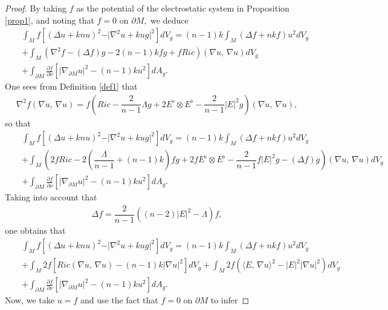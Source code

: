 \documentclass{amsart}
\numberwithin{equation}{section}
\begin{document}
\begin{proof}
By taking $f$ as the potential of the electrostatic system in Proposition \ref{prop1}, and noting that $f = 0$ on $\partial M,$ we deduce
		\begin{eqnarray*}
			&&\int_{M}f\left[\left(\Delta u +knu\right)^2 - \vert \nabla^2u+kug\vert^{2}\right]dV_g = (n-1)k\int_{M}\left(\Delta f +nkf\right)u^2dV_g\\
			&&+\int_{M}\left(\nabla^2f-(\Delta f)g - 2(n-1)kfg +fRic\right)(\nabla u,\,\nabla u)dV_g\\
			&&+\int_{\partial M}\frac{\partial f}{\partial\nu}\left[\vert\nabla_{\partial M}u\vert^2 -(n-1)ku^2\right]dA_g.
		\end{eqnarray*} One sees from Definition \ref{def1} that
		\begin{eqnarray*}
			\nabla^2f(\nabla u,\,\nabla u) = f\left(Ric - \dfrac{2}{n-1}\Lambda g + 2E^\flat\otimes E^\flat - \dfrac{2}{n-1}|E|^2g\right)(\nabla u,\,\nabla u),
		\end{eqnarray*}
		so that
		\begin{eqnarray*}
			&&\int_{M}f\left[\left(\Delta u +knu\right)^2 - \vert \nabla^2u+kug\vert^{2}\right]dV_g = (n-1)k\int_{M}\left(\Delta f +nkf\right)u^2dV_g\\
			&&+\int_{M}\left(2f{Ric} - 2\left(\dfrac{\Lambda}{n-1} +(n-1)k\right)fg + 2f E^\flat\otimes E^\flat - \dfrac{2}{n-1}f|E|^2g-(\Delta f)g	\right)(\nabla u,\,\nabla u)dV_g\\
			&&+\int_{\partial M}\frac{\partial f}{\partial\nu}\left[\vert\nabla_{\partial M}u\vert^2 -(n-1)ku^2\right]dA_g.
		\end{eqnarray*} Taking into account that
		\begin{eqnarray*}
			\Delta f = \dfrac{2}{n - 1}\left((n - 2)|E|^2 - 
			\Lambda\right)f,
		\end{eqnarray*}
		one obtains that
		\begin{eqnarray*}
			&&\int_{M}f\left[\left(\Delta u +knu\right)^2 - \vert \nabla^2u+kug\vert^{2}\right]dV_g = (n-1)k\int_{M}\left(\Delta f +nkf\right)u^2dV_g\\
			&&+\int_{M}2f\left[{Ric}(\nabla u,\,\nabla u) - (n-1)k|\nabla u|^{2}\right]dV_g + \int_{M}2f\left(\langle E,\,\nabla u\rangle^{2} - |E|^2|\nabla u|^{2}	\right)dV_g\\
			&&+\int_{\partial M}\frac{\partial f}{\partial\nu}\left[\vert\nabla_{\partial M}u\vert^2 -(n-1)ku^2\right]dA_g.
		\end{eqnarray*} Now, we take $u=f$ and use the fact that $f=0$ on $\partial M$ to infer

\end{proof}
\end{document}
